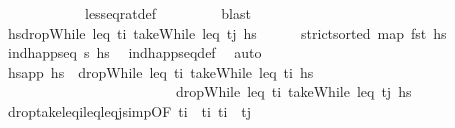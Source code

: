 \begin{isabellebody}
\ \ \ \ \ \ \ \ \ \ \ \ less{\isacharunderscore}{\kern0pt}eq{\isacharunderscore}{\kern0pt}rat{\isacharunderscore}{\kern0pt}def\ \isanewline
\ \ \ \ \ \ \isamarkupfalse%
\ blast\isanewline
\isanewline
\ \ \ \ \isamarkupfalse%
\ {\isacharquery}{\kern0pt}hs{\isacharprime}{\kern0pt}{\isacharequal}{\kern0pt}{\isachardoublequoteopen}dropWhile\ {\isacharparenleft}{\kern0pt}leq\ t\isactrlsub i{\isacharparenright}{\kern0pt}\ {\isacharparenleft}{\kern0pt}takeWhile\ {\isacharparenleft}{\kern0pt}leq\ t\isactrlsub j{\isacharparenright}{\kern0pt}\ hs{\isacharparenright}{\kern0pt}{\isachardoublequoteclose}\isanewline
\ \ \ \ \isamarkupfalse%
\ {\isachardoublequoteopen}strict{\isacharunderscore}{\kern0pt}sorted\ {\isacharparenleft}{\kern0pt}map\ fst\ hs{\isacharparenright}{\kern0pt}{\isachardoublequoteclose}\isanewline
\ \ \ \ \ \ \isamarkupfalse%
\ {\isacartoucheopen}ind{\isacharunderscore}{\kern0pt}happ{\isacharunderscore}{\kern0pt}seq\ {\isasympi}s\ hs{\isacartoucheclose}\ \isamarkupfalse%
\ ind{\isacharunderscore}{\kern0pt}happ{\isacharunderscore}{\kern0pt}seq{\isacharunderscore}{\kern0pt}def\ \isamarkupfalse%
\ auto\isanewline
\ \ \ \ \isamarkupfalse%
\ \isamarkupfalse%
\ hs{\isacharprime}{\kern0pt}{\isacharunderscore}{\kern0pt}app{\isacharcolon}{\kern0pt}\ {\isachardoublequoteopen}{\isacharquery}{\kern0pt}hs{\isacharprime}{\kern0pt}\ {\isacharequal}{\kern0pt}\ dropWhile\ {\isacharparenleft}{\kern0pt}leq\ t\isactrlsub i{\isacharparenright}{\kern0pt}\ {\isacharparenleft}{\kern0pt}takeWhile\ {\isacharparenleft}{\kern0pt}leq\ t\isactrlsub i{\isacharprime}{\kern0pt}{\isacharparenright}{\kern0pt}\ hs{\isacharparenright}{\kern0pt}\ \isanewline
\ \ \ \ \ \ \ \ \ \ \ \ \ \ \ \ \ \ \ \ \ \ \ \ {\isacharat}{\kern0pt}\ dropWhile\ {\isacharparenleft}{\kern0pt}leq\ t\isactrlsub i{\isacharprime}{\kern0pt}{\isacharparenright}{\kern0pt}\ {\isacharparenleft}{\kern0pt}takeWhile\ {\isacharparenleft}{\kern0pt}leq\ t\isactrlsub j{\isacharparenright}{\kern0pt}\ hs{\isacharparenright}{\kern0pt}{\isachardoublequoteclose}\isanewline
\ \ \ \ \ \ \isamarkupfalse%
\ drop{\isacharunderscore}{\kern0pt}take{\isacharunderscore}{\kern0pt}leq\isactrlsub i{\isacharunderscore}{\kern0pt}leq{\isacharunderscore}{\kern0pt}leq\isactrlsub j{\isacharunderscore}{\kern0pt}simp{\isacharbrackleft}{\kern0pt}OF\ {\isacartoucheopen}t\isactrlsub i\ {\isasymle}\ t\isactrlsub i{\isacharprime}{\kern0pt}{\isacartoucheclose}\ {\isacartoucheopen}t\isactrlsub i{\isacharprime}{\kern0pt}\ {\isasymle}\ t\isactrlsub j{\isacartoucheclose}{\isacharbrackright}{\kern0pt}\ \isamarkupfalse%

\end{isabellebody}

